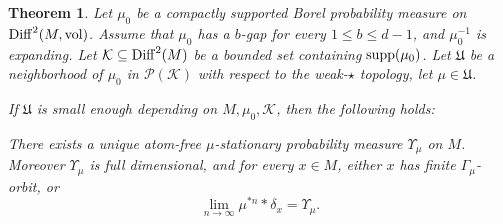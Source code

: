\documentclass[11pt, leqno, fleqn]{amsart}
\def\cU{\mathfrak U}
\newcommand{\margem}[1]{\marginpar{{\scriptsize {#1}}}}
\def\clr{   \color{red}}
\def\clo{   \color{orange}}
\def\clb{   \color{black}}
\def \N{{\mathbb N}}
\newcommand{\cP}{{\mathcal P}}
\newcommand{\cK}{{\mathcal K}}
\newtheorem{thm}{\bf Theorem}[section]
\theoremstyle{definition}
\newtheorem{rema}[thm]{\bf Remark}
\DeclareMathOperator{\diff}{Diff}
\theoremstyle{definition}
\def\supp{{\rm supp}}
\def \vol{  {\rm vol} }
\newcommand{\Diff}{{\rm Diff}}
\begin{document}



\begin{thm} \label{main thm 2Dissipative}
	Let $\mu_0$ be a compactly supported Borel probability measure on $\Diff^{2}(M, \vol)$.
	Assume that  $\mu_0$  has a $b$-gap  for every $1 \leq b\leq d - 1$, and $\mu_{0}^{-1}$ is expanding.
	Let  $\cK \subseteq\Diff^{2}(M)$ be a bounded set containing $\supp(\mu_0)$.
	Let $\cU$ be a neighborhood of $\mu_0$ in $\cP(\cK)$ with respect to the weak-$\star$ topology, let $\mu \in \cU$.
	
	If $\cU$ is small enough depending on $M, \mu_{0},\cK$, then the following holds:
	
	There exists a unique atom-free $\mu$-stationary probability measure $\Upsilon_{\mu}$ on $M$.   Moreover $\Upsilon_{\mu}$ is full dimensional, and  for every  $x \in M$, either $x$ has finite $\Gamma_{\mu}$-orbit, or  
	$$\lim_{n \to \infty} \mu^{*n} * \delta_{x} = \Upsilon_{\mu}.$$   
\end{thm}




	

 
\end{document}

